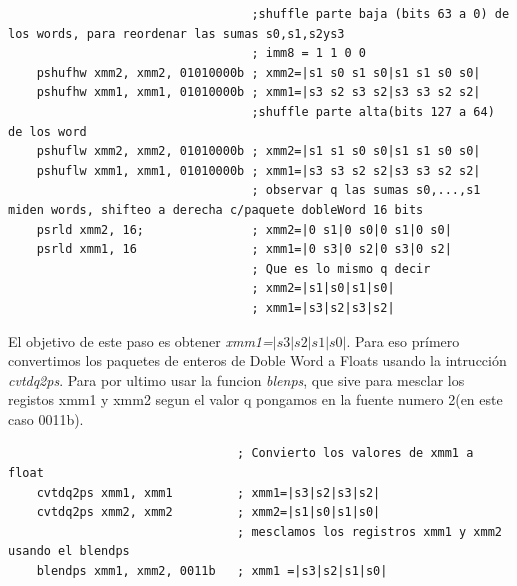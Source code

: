 \begin{codesnippet}
\begin{verbatim}
                                  ;shuffle parte baja (bits 63 a 0) de los words, para reordenar las sumas s0,s1,s2ys3
                                  ; imm8 = 1 1 0 0
    pshufhw xmm2, xmm2, 01010000b ; xmm2=|s1 s0 s1 s0|s1 s1 s0 s0| 
    pshufhw xmm1, xmm1, 01010000b ; xmm1=|s3 s2 s3 s2|s3 s3 s2 s2|
                                  ;shuffle parte alta(bits 127 a 64) de los word
    pshuflw xmm2, xmm2, 01010000b ; xmm2=|s1 s1 s0 s0|s1 s1 s0 s0|
    pshuflw xmm1, xmm1, 01010000b ; xmm1=|s3 s3 s2 s2|s3 s3 s2 s2|
                                  ; observar q las sumas s0,...,s1 miden words, shifteo a derecha c/paquete dobleWord 16 bits
    psrld xmm2, 16;               ; xmm2=|0 s1|0 s0|0 s1|0 s0| 
    psrld xmm1, 16                ; xmm1=|0 s3|0 s2|0 s3|0 s2| 
								  ; Que es lo mismo q decir
                                  ; xmm2=|s1|s0|s1|s0|
                                  ; xmm1=|s3|s2|s3|s2|
\end{verbatim}
\end{codesnippet}

El objetivo de este paso es obtener \emph{xmm1=$|s3|s2|s1|s0|$}. Para eso prímero convertimos los paquetes de enteros de Doble Word a Floats usando la intrucción \emph{cvtdq2ps}. Para por ultimo usar la funcion \emph{blenps}, que sive para mesclar los registos xmm1 y xmm2 segun el valor q pongamos en la fuente numero 2(en este caso 0011b).
\begin{codesnippet}
\begin{verbatim}
                                ; Convierto los valores de xmm1 a float
    cvtdq2ps xmm1, xmm1         ; xmm1=|s3|s2|s3|s2|
    cvtdq2ps xmm2, xmm2         ; xmm2=|s1|s0|s1|s0|
                                ; mesclamos los registros xmm1 y xmm2 usando el blendps
    blendps xmm1, xmm2, 0011b   ; xmm1 =|s3|s2|s1|s0|
\end{verbatim}
\end{codesnippet}

